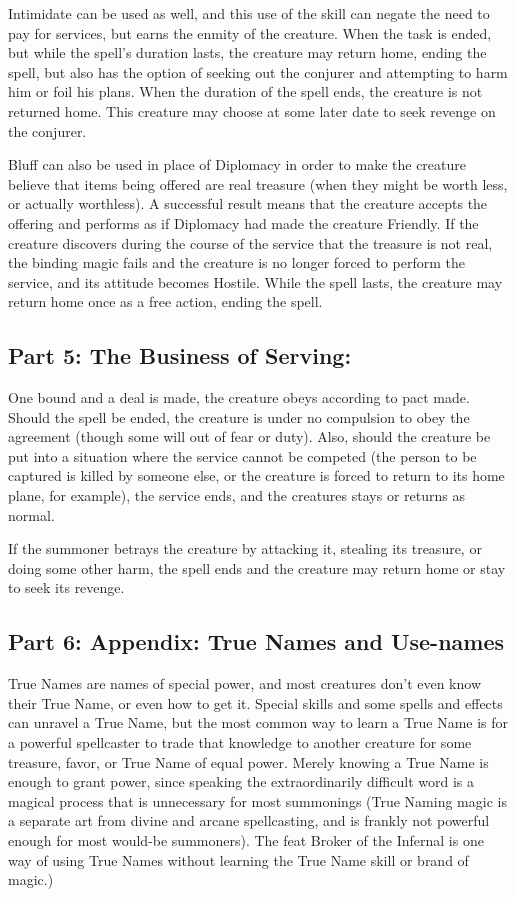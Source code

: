 Intimidate can be used as well, and this use of the skill can negate the need to pay for services, but earns the enmity of the creature. When the task is ended, but while the spell's duration lasts, the creature may return home, ending the spell, but also has the option of seeking out the conjurer and attempting to harm him or foil his plans. When the duration of the spell ends, the creature is not returned home. This creature may choose at some later date to seek revenge on the conjurer.

Bluff can also be used in place of Diplomacy in order to make the creature believe that items being offered are real treasure (when they might be worth less, or actually worthless). A successful result means that the creature accepts the offering and performs as if Diplomacy had made the creature Friendly. If the creature discovers during the course of the service that the treasure is not real, the binding magic fails and the creature is no longer forced to perform the service, and its attitude becomes Hostile. While the spell lasts, the creature may return home once as a free action, ending the spell.

\subsection{Part 5: The Business of Serving:}

One bound and a deal is made, the creature obeys according to pact made. Should the spell be ended, the creature is under no compulsion to obey the agreement (though some will out of fear or duty). Also, should the creature be put into a situation where the service cannot be competed (the person to be captured is killed by someone else, or the creature is forced to return to its home plane, for example), the service ends, and the creatures stays or returns as normal.

If the summoner betrays the creature by attacking it, stealing its treasure, or doing some other harm, the spell ends and the creature may return home or stay to seek its revenge.

\subsection{Part 6: Appendix: True Names and Use-names}
True Names are names of special power, and most creatures don't even know their True Name, or even how to get it. Special skills and some spells and effects can unravel a True Name, but the most common way to learn a True Name is for a powerful spellcaster to trade that knowledge to another creature for some treasure, favor, or True Name of equal power. Merely knowing a True Name is enough to grant power, since speaking the extraordinarily difficult word is a magical process that is unnecessary for most summonings (True Naming magic is a separate art from divine and arcane spellcasting, and is frankly not powerful enough for most would-be summoners). The feat Broker of the Infernal is one way of using True Names without learning the True Name skill or brand of magic.)

